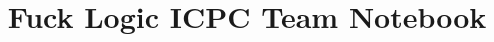 \documentclass[a4paper,12pt]{article}
\title{\vspace{-4ex}\Large{Fuck Logic ICPC Team Notebook}}
\author{}
\date{}
\begin{document}
\begin{landscape}
\begin{multicols}{2}

\maketitle
\vspace{-13ex}
\pagestyle{fancy}




\end{multicols}

\end{landscape}
\end{document}
